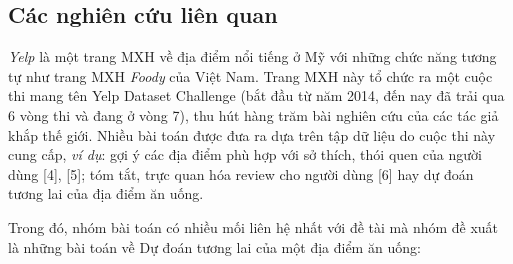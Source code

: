 \documentclass[12pt]{extarticle}
\begin{document}
		\subsection{Các nghiên cứu liên quan}
			\par \textit{Yelp} là một trang MXH về địa điểm nổi tiếng ở Mỹ với những chức năng tương tự như trang MXH \textit{Foody}  của Việt Nam. Trang MXH này tổ chức ra một cuộc thi mang tên Yelp Dataset Challenge (bắt đầu từ năm 2014, đến nay đã trải qua 6 vòng thi và đang ở vòng 7), thu hút hàng trăm bài nghiên cứu của các tác giả khắp thế giới. Nhiều bài toán được đưa ra dựa trên tập dữ liệu do cuộc thi này cung cấp, \textit{ví dụ}: gợi ý các địa điểm phù hợp với sở thích, thói quen của người dùng [4], [5]; tóm tắt, trực quan hóa review cho người dùng [6] hay dự đoán tương lai của địa điểm ăn uống.
			\par Trong đó, nhóm bài toán có nhiều mối liên hệ nhất với đề tài mà nhóm đề xuất là những bài toán về Dự đoán tương lai của một địa điểm ăn uống:
\end{document}
